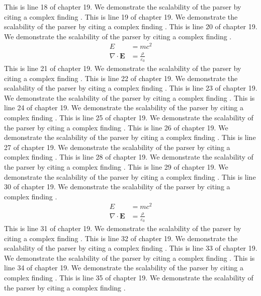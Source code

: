 This is line 18 of chapter 19. We demonstrate the scalability of the parser by citing a complex finding \cite{ref19_18}.
This is line 19 of chapter 19. We demonstrate the scalability of the parser by citing a complex finding \cite{ref19_19}.
This is line 20 of chapter 19. We demonstrate the scalability of the parser by citing a complex finding \cite{ref19_20}.
\begin{align*}
  E &= mc^2 \\
  \nabla \cdot \mathbf{E} &= \frac{\rho}{\varepsilon_0}
\end{align*}
This is line 21 of chapter 19. We demonstrate the scalability of the parser by citing a complex finding \cite{ref19_21}.
This is line 22 of chapter 19. We demonstrate the scalability of the parser by citing a complex finding \cite{ref19_22}.
This is line 23 of chapter 19. We demonstrate the scalability of the parser by citing a complex finding \cite{ref19_23}.
This is line 24 of chapter 19. We demonstrate the scalability of the parser by citing a complex finding \cite{ref19_24}.
This is line 25 of chapter 19. We demonstrate the scalability of the parser by citing a complex finding \cite{ref19_25}.
This is line 26 of chapter 19. We demonstrate the scalability of the parser by citing a complex finding \cite{ref19_26}.
This is line 27 of chapter 19. We demonstrate the scalability of the parser by citing a complex finding \cite{ref19_27}.
This is line 28 of chapter 19. We demonstrate the scalability of the parser by citing a complex finding \cite{ref19_28}.
This is line 29 of chapter 19. We demonstrate the scalability of the parser by citing a complex finding \cite{ref19_29}.
This is line 30 of chapter 19. We demonstrate the scalability of the parser by citing a complex finding \cite{ref19_30}.
\begin{align*}
  E &= mc^2 \\
  \nabla \cdot \mathbf{E} &= \frac{\rho}{\varepsilon_0}
\end{align*}
This is line 31 of chapter 19. We demonstrate the scalability of the parser by citing a complex finding \cite{ref19_31}.
This is line 32 of chapter 19. We demonstrate the scalability of the parser by citing a complex finding \cite{ref19_32}.
This is line 33 of chapter 19. We demonstrate the scalability of the parser by citing a complex finding \cite{ref19_33}.
This is line 34 of chapter 19. We demonstrate the scalability of the parser by citing a complex finding \cite{ref19_34}.
This is line 35 of chapter 19. We demonstrate the scalability of the parser by citing a complex finding \cite{ref19_35}.
